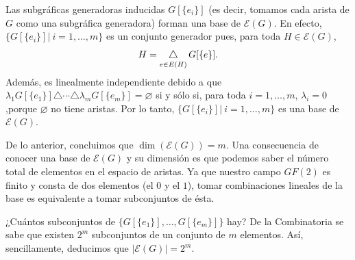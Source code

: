 Las subgráficas generadoras inducidas $G[\{e_{i}\}]$ (es decir, tomamos cada arista de $G$ como una subgráfica generadora) forman una base de $\mathcal{E}(G)$. En efecto, $\Big\{G[\{e_{i}\}]\Big|\:\! i = 1,\ldots, m\Big\}$ es un conjunto generador pues, para toda $H \in \mathcal{E}(G)$, $$H = \difsym_{e \in E(H)} G[\{e\}].$$ Además, es linealmente independiente debido a que $\lambda_{1}G[\{e_{1}\}] \triangle \cdots \triangle \lambda_{m}G[\{e_{m}\}] = \varnothing$ si y sólo si, para toda $i = 1, \ldots, m$, $\lambda_{i}=0$,porque $\varnothing$ no tiene aristas. Por lo tanto, $\Big\{G[\{e_{i}\}]\Big|\:\! i = 1,\ldots, m\Big\}$ es una base de $\mathcal{E}(G)$.

De lo anterior, concluimos que $\dim(\mathcal{E}(G)) = m$. Una consecuencia de conocer una base de $\mathcal{E}(G)$ y su dimensión es que podemos saber el número total de elementos en el espacio de aristas. Ya que nuestro campo $GF(2)$ es finito y consta de dos elementos (el $0$ y el $1$), tomar combinaciones lineales de la base es equivalente a tomar subconjuntos de ésta. 

¿Cuántos subconjuntos de $\Big\{G[\{e_{1}\}],\ldots, G[\{e_{m}\}]\Big\}$ hay? De la Combinatoria se sabe que existen $2^{m}$ subconjuntos de un conjunto de $m$ elementos. Así, sencillamente, deducimos que $|\mathcal{E}(G)| = 2^{m}$.

